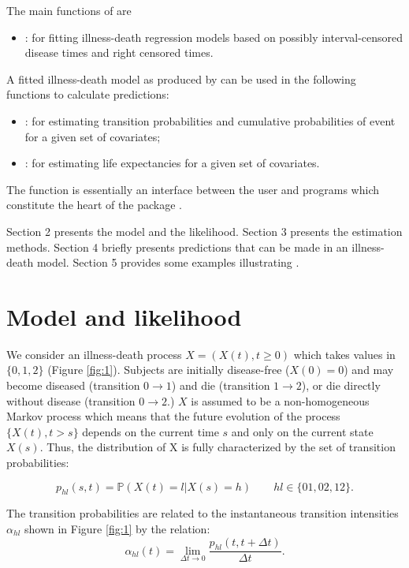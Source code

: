 \documentclass[article]{jss}
\begin{document}
The main functions of  are
\begin{itemize}
\item {} : for fitting illness-death regression models based on possibly interval-censored disease times and right censored times.
\end{itemize}
 A fitted illness-death model as produced
by  can be used in the following functions to calculate predictions: 
\begin{itemize}
\item {} : for estimating transition probabilities and cumulative probabilities of event for a given set of covariates;
\item {} : for estimating life expectancies for a given set of covariates.
\end{itemize}

The  function  is essentially an interface between 
the user
and  programs which constitute the heart of the
package .

Section 2 presents the model and the likelihood.
Section 3 presents the estimation methods.
Section 4 briefly presents predictions that can be made in an illness-death model. 
Section 5 provides some examples illustrating .

\section{Model and likelihood}
\label{sec-2}

We consider an illness-death process \(X=(X(t),t \geq 0)\) which takes
values in \(\{0,1,2\}\) (Figure \ref{fig:1}). Subjects are initially
disease-free (\(X(0)=0\)) and may become diseased (transition \(0
\rightarrow 1\)) and die (transition \(1 \rightarrow 2\)), or die
directly without disease (transition \(0 \rightarrow 2\).)  \(X\) is
assumed to be a non-homogeneous Markov process which means that the
future evolution of the process \(\{X(t),t>s\}\) depends on the current
time \(s\) and only on the current state \(X(s)\). Thus, the distribution
of X is fully characterized by the set of transition probabilities:

\begin{equation*}
p_{hl}(s,t)=\mathbb{P}(X(t)=l|X(s)=h)\qquad hl \in \{01,02,12\}.
\end{equation*}

The transition probabilities are related to the instantaneous
transition intensities \(\alpha_{hl}\) shown in Figure \ref{fig:1} by
the relation: 
\begin{equation*}
\alpha_{hl}(t)=\lim_{\Delta t \to
0}\frac{p_{hl}(t,t+\Delta t)}{\Delta t}.
\end{equation*}
\end{document}
